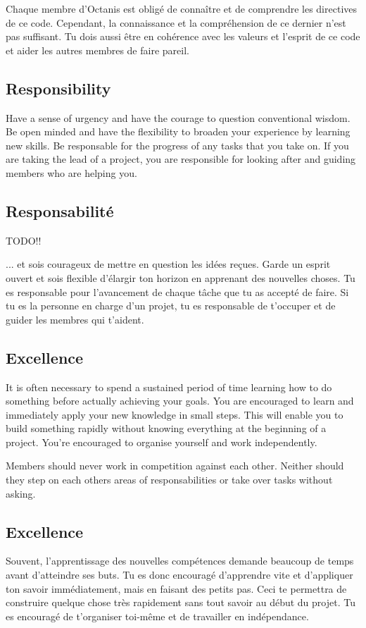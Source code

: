 	Chaque membre d'Octanis est obligé de connaître et de comprendre les directives de ce code.
	Cependant, la connaissance et la compréhension de ce dernier n'est pas suffisant. Tu dois aussi être en cohérence avec les valeurs et l'esprit de ce code et aider les autres membres de faire pareil.



	
\english
	\subsection{Responsibility}
	Have a sense of urgency and have the courage to question conventional wisdom. Be open minded and have the flexibility to broaden your experience by learning new skills. Be responsable for the progress of any tasks that you take on. If you are taking the lead of a project, you are responsible for looking after and guiding members who are helping you.



\french
	\subsection{Responsabilité}

	TODO!!

	... et sois courageux de mettre en question les idées reçues. Garde un esprit ouvert et sois flexible d'élargir ton horizon en apprenant des nouvelles choses. Tu es responsable pour l'avancement de chaque tâche que tu as accepté de faire. Si tu es la personne en charge d'un projet, tu es responsable de t'occuper et de guider les membres qui t'aident. 

\english
	\subsection{Excellence}
 	It is often necessary to spend a sustained period of time learning how to do something before actually achieving your goals. You are encouraged to learn and immediately apply your new knowledge in small steps. This will enable you to build something rapidly without knowing everything at the beginning of a project. You're encouraged to organise yourself and work independently. 
 	

	Members should never work in competition against each other. Neither should they step on each others areas of responsabilities or take over tasks without asking.




\french
	\subsection{Excellence}
	Souvent, l'apprentissage des nouvelles compétences demande beaucoup de temps avant d'atteindre ses buts. Tu es donc encouragé d'apprendre vite et d'appliquer ton savoir immédiatement, mais en faisant des petits pas. Ceci te permettra de construire quelque chose très rapidement sans tout savoir au début du projet. Tu es encouragé de t'organiser toi-même et de travailler en indépendance. 


